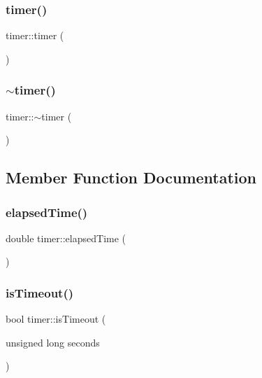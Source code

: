 \subsubsection{\texorpdfstring{timer()}{timer()}}
{\footnotesize\ttfamily timer\+::timer (\begin{DoxyParamCaption}{ }\end{DoxyParamCaption})\hspace{0.3cm}{\ttfamily [inline]}}

\hypertarget{classtimer_aee05958ea6b0fbf36ea1fd22747cd546}{}\label{classtimer_aee05958ea6b0fbf36ea1fd22747cd546} 
\subsubsection{\texorpdfstring{$\sim$timer()}{~timer()}}
{\footnotesize\ttfamily timer\+::$\sim$timer (\begin{DoxyParamCaption}{ }\end{DoxyParamCaption})\hspace{0.3cm}{\ttfamily [inline]}}



\subsection{Member Function Documentation}
\hypertarget{classtimer_ad24294c856c6962200880fb1eeb09cc4}{}\label{classtimer_ad24294c856c6962200880fb1eeb09cc4} 
\subsubsection{\texorpdfstring{elapsed\+Time()}{elapsedTime()}}
{\footnotesize\ttfamily double timer\+::elapsed\+Time (\begin{DoxyParamCaption}{ }\end{DoxyParamCaption})\hspace{0.3cm}{\ttfamily [inline]}}

\hypertarget{classtimer_a884fa19b64e312656f79aeecdfb5fb62}{}\label{classtimer_a884fa19b64e312656f79aeecdfb5fb62} 
\subsubsection{\texorpdfstring{is\+Timeout()}{isTimeout()}}
{\footnotesize\ttfamily bool timer\+::is\+Timeout (\begin{DoxyParamCaption}\item[{unsigned long}]{seconds }\end{DoxyParamCaption})\hspace{0.3cm}{\ttfamily [inline]}}

